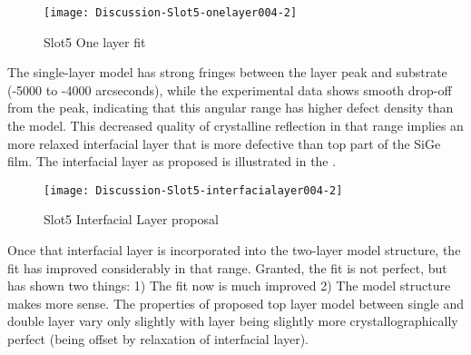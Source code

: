 \begin{figure}[hc]%
\caption{Slot5 One layer fit}
\label{Slot5-One004}
\begin{minipage}{0.85\linewidth}
\texttt{[image: Discussion-Slot5-onelayer004-2]}
\end{minipage}
\end{figure}

The single-layer model has strong fringes between the layer peak and substrate (-5000 to -4000 arcseconds), while the experimental data shows smooth drop-off from the peak, indicating that this angular range has higher defect density than the model.   This decreased quality of crystalline reflection in that range  implies an more relaxed interfacial layer that is more defective than top part of the SiGe film.  The interfacial layer as proposed is illustrated in the .

\begin{figure}[hc]%
\caption{Slot5 Interfacial Layer proposal}
\label{Slot5-Interfacial004}
\begin{minipage}{0.85\linewidth}
\texttt{[image: Discussion-Slot5-interfacialayer004-2]}
\end{minipage}
\end{figure}

Once that interfacial layer is incorporated into the two-layer model structure, the fit has improved considerably in that range.  Granted, the fit is not perfect, but has shown two things:  1) The fit now is much improved 2) The model structure makes more sense.  The properties of proposed top layer model between single and double layer vary only slightly with layer being slightly more crystallographically perfect (being offset by relaxation of interfacial layer).

